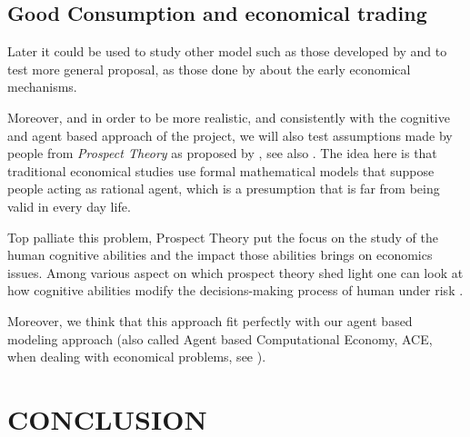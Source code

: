 \documentclass{wscpaperproc}
\begin{document}
\subsection{Good Consumption and economical trading}
Later it could be used to study other model such as those developed by 
\cite{rubinstein_equilibrium_1985} and to test more general proposal, as those done by \cite{polanyi_trade_1957,polanyi_livelihood_1977} about the early economical mechanisms.

Moreover, and in order to be more realistic, and consistently with the cognitive and agent based approach of the project, we will also test assumptions made by people from \emph{Prospect Theory} as proposed by 
\cite{kahneman_prospect_1979}, see also
\cite{camerer_prospect_2004}. The idea here is that traditional economical studies use formal mathematical models that suppose people acting as rational agent, which is a presumption that is far from being valid  in every day life. 

Top palliate this problem, Prospect Theory put the focus on the study of the human cognitive abilities and the impact those abilities brings on economics issues. Among various aspect on which prospect theory shed light one can look at how cognitive abilities modify the decisions-making process of human under risk
\cite{weber_disposition_1998}.

Moreover, we think that this approach fit perfectly with our agent based modeling approach (also called Agent based Computational Economy, ACE, when dealing with economical problems, see
\cite{tesfatsion_introduction_2001}).


\section{CONCLUSION}





  
\end{document}
